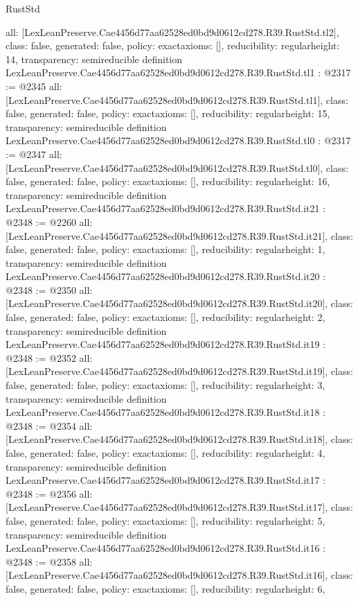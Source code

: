 \begin{lexlean}{RustStd}
\begin{coremodule}
{  all: [LexLeanPreserve.Cae4456d77aa62528ed0bd9d0612cd278.R39.RustStd.tl2],
  class: false,
  generated: false,
  policy: exact{axioms: []},
  reducibility: regular{height: 14},
  transparency: semireducible
}
definition LexLeanPreserve.Cae4456d77aa62528ed0bd9d0612cd278.R39.RustStd.tl1 : @2317 := @2345 {
  all: [LexLeanPreserve.Cae4456d77aa62528ed0bd9d0612cd278.R39.RustStd.tl1],
  class: false,
  generated: false,
  policy: exact{axioms: []},
  reducibility: regular{height: 15},
  transparency: semireducible
}
definition LexLeanPreserve.Cae4456d77aa62528ed0bd9d0612cd278.R39.RustStd.tl0 : @2317 := @2347 {
  all: [LexLeanPreserve.Cae4456d77aa62528ed0bd9d0612cd278.R39.RustStd.tl0],
  class: false,
  generated: false,
  policy: exact{axioms: []},
  reducibility: regular{height: 16},
  transparency: semireducible
}
definition LexLeanPreserve.Cae4456d77aa62528ed0bd9d0612cd278.R39.RustStd.it21 : @2348 := @2260 {
  all: [LexLeanPreserve.Cae4456d77aa62528ed0bd9d0612cd278.R39.RustStd.it21],
  class: false,
  generated: false,
  policy: exact{axioms: []},
  reducibility: regular{height: 1},
  transparency: semireducible
}
definition LexLeanPreserve.Cae4456d77aa62528ed0bd9d0612cd278.R39.RustStd.it20 : @2348 := @2350 {
  all: [LexLeanPreserve.Cae4456d77aa62528ed0bd9d0612cd278.R39.RustStd.it20],
  class: false,
  generated: false,
  policy: exact{axioms: []},
  reducibility: regular{height: 2},
  transparency: semireducible
}
definition LexLeanPreserve.Cae4456d77aa62528ed0bd9d0612cd278.R39.RustStd.it19 : @2348 := @2352 {
  all: [LexLeanPreserve.Cae4456d77aa62528ed0bd9d0612cd278.R39.RustStd.it19],
  class: false,
  generated: false,
  policy: exact{axioms: []},
  reducibility: regular{height: 3},
  transparency: semireducible
}
definition LexLeanPreserve.Cae4456d77aa62528ed0bd9d0612cd278.R39.RustStd.it18 : @2348 := @2354 {
  all: [LexLeanPreserve.Cae4456d77aa62528ed0bd9d0612cd278.R39.RustStd.it18],
  class: false,
  generated: false,
  policy: exact{axioms: []},
  reducibility: regular{height: 4},
  transparency: semireducible
}
definition LexLeanPreserve.Cae4456d77aa62528ed0bd9d0612cd278.R39.RustStd.it17 : @2348 := @2356 {
  all: [LexLeanPreserve.Cae4456d77aa62528ed0bd9d0612cd278.R39.RustStd.it17],
  class: false,
  generated: false,
  policy: exact{axioms: []},
  reducibility: regular{height: 5},
  transparency: semireducible
}
definition LexLeanPreserve.Cae4456d77aa62528ed0bd9d0612cd278.R39.RustStd.it16 : @2348 := @2358 {
  all: [LexLeanPreserve.Cae4456d77aa62528ed0bd9d0612cd278.R39.RustStd.it16],
  class: false,
  generated: false,
  policy: exact{axioms: []},
  reducibility: regular{height: 6},
}
\end{coremodule}
\end{lexlean}
